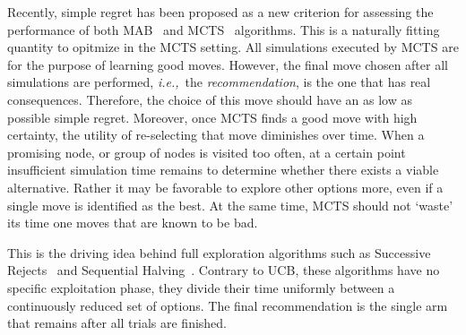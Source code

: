 \documentclass{kecsmstr}
\newcommand{\ie}{{\it i.e.,}~}
\begin{document}
Recently, simple regret has been proposed as a new criterion for assessing the performance of both MAB~ and MCTS~ algorithms. This is a naturally fitting quantity to opitmize in the MCTS setting. All simulations executed by MCTS are for the purpose of learning good moves. However, the final move chosen after all simulations are performed, \ie the \emph{recommendation}, is the one that has real consequences. Therefore, the choice of this move should have an as low as possible simple regret. Moreover, once MCTS finds a good move with high certainty, the utility of re-selecting that move diminishes over time. When a promising node, or group of nodes is visited too often, at a certain point insufficient simulation time remains to determine whether there exists a viable alternative. Rather it may be favorable to explore other options more, even if a single move is identified as the best. At the same time, MCTS should not `waste' its time one moves that are known to be bad.

This is the driving idea behind full exploration algorithms such as Successive Rejects~ and Sequential Halving~. Contrary to UCB, these algorithms have no specific exploitation phase, they divide their time uniformly between a continuously reduced set of options. The final recommendation is the single arm that remains after all trials are finished.
\end{document}
